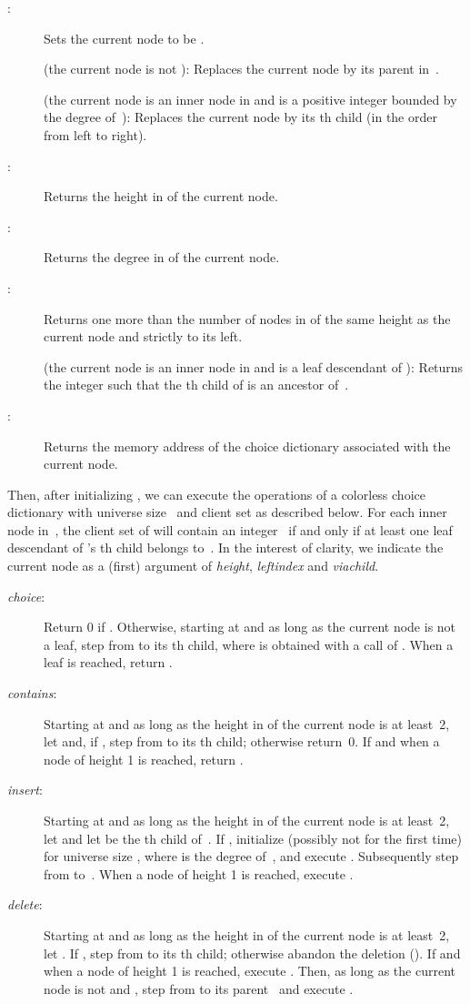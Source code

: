 \documentclass[envcountsame,envcountsect,undated,nolinenumbers]{lnthi}
\def\Tvn#1{\hbox{\textit{#1\/}}}
\begin{document}
\begin{description}
\item[\normalfont:]
Sets the current node to be .
\item[\normalfont]
(the current node is not ):
Replaces the current node by its parent in~.
\item[\normalfont]
(the current node  is an inner node in 
and  is a positive integer bounded by the
degree of~):
Replaces the current node by its th child
(in the order from left to right).
\item[\normalfont:]
Returns the height in  of the current node.
\item[\normalfont:]
Returns the degree in  of the current node.
\item[\normalfont:]
Returns one more than the number of nodes in  of the same
height as the current node and strictly to its left.
\item[\normalfont]
(the current node  is an inner node in  and
 is a leaf descendant of ):
Returns the integer  such that the th child
of  is an ancestor of~.
\item[\normalfont:]
Returns the memory address of the choice
dictionary associated with the current node.
\end{description}

Then, after initializing ,
we can execute the operations 
of a colorless choice dictionary
with universe size~ and client set 
as described below.
For each inner node  in~,
the client set of  will contain an integer~
if and only if at least one leaf descendant of
's th child belongs to~.
In the interest of clarity, we indicate the
current node as a (first) argument of
\Tvn{height}, \Tvn{leftindex} and \Tvn{viachild}.

\begin{description}
\item[\normalfont\Tvn{choice}:]
Return 0 if .
Otherwise,
starting at  and as long as the current node
 is not a leaf, step from  to its th child,
where  is obtained with a call of .
When a leaf  is reached, return .
\item[\normalfont\Tvn{contains}:]
Starting at  and as long as the height in
 of the current node 
is at least~2, let 
and, if ,
step from  to its th child;
otherwise return~0.
If and when a node  of height 1 is reached,
return .
\item[\normalfont\Tvn{insert}:]
Starting at  and as long as
the height in  of
the current node  is at least~2,
let  and let
 be the th child of~.
If ,
initialize  (possibly not for the first time)
for universe size , where  is the degree of~,
and execute .
Subsequently step from  to~.
When a node  of height 1 is reached,
execute .
\item[\normalfont\Tvn{delete}:]
Starting at  and as long as
the height in  of the current node  is at least~2,
let .
If ,
step from  to its th child;
otherwise abandon the deletion ().
If and when a node  of height 1 is reached,
execute .
Then, as long as the current node  is not 
and ,
step from  to its parent~
and execute .
\end{description}
\end{document}
